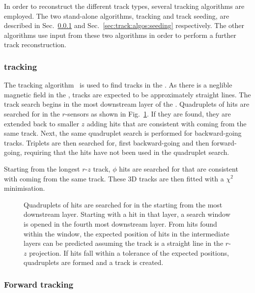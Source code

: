 In order to reconstruct the different track types, several tracking algorithms are employed. The two stand-alone algorithms, \velo tracking and track seeding, are described in Sec.~\ref{sec:track:algos:velo} and Sec.~\ref{sec:track:algos:seeding} respectively. The other algorithms use input from these two algorithms in order to perform a further track reconstruction.

\subsubsection{\velo tracking}
\label{sec:track:algos:velo}

The \velo tracking algorithm~\cite{fastvelo} is used to find tracks in the \velo. As there is a neglible magnetic field in the \velo, tracks are expected to be approximately straight lines. The track search begins in the most downstream layer of the \velo. Quadruplets of hits are searched for in the $r$-sensors as shown in Fig.~\ref{fig:velo-tracking}. If they are found, they are extended back to smaller $z$ adding hits that are consistent with coming from the same track. Next, the same quadruplet search is performed for backward-going tracks. Triplets are then searched for, first backward-going and then forward-going, requiring that the hits have not been used in the quadruplet search.

Starting from the longest $r$-$z$ track, $\phi$ hits are searched for that are consistent with coming from the same track. These 3D tracks are then fitted with a $\chi^{2}$ minimisation.

\begin{figure}[!tb]
  \centering
  
  \caption{Quadruplets of hits are searched for in the \velo starting from the most downstream layer. Starting with a hit in that layer, a search window is opened in the fourth most downstream layer. From hits found within the window, the expected position of hits in the intermediate layers can be predicted assuming the track is a straight line in the $r$-$z$ projection. If hits fall within a tolerance of the expected positions, quadruplets are formed and a track is created.}
  \label{fig:velo-tracking}
\end{figure}

\subsubsection{Forward tracking}
\label{sec:track:algos:forward}

